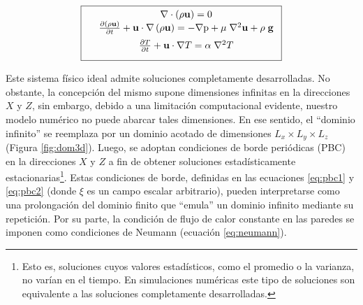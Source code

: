 \begin{equation}
        \boxed{ \begin{array}{lcc}
              &  \nabla \cdot \left( \rho \mathbf{u} \right) = 0 \\
              \vspace*{2mm}
              &  \frac{\partial \left( \rho \mathbf{u} \right)}{\partial t} + \mathbf{u} \cdot \nabla  \left( \rho \mathbf{u} \right) = -\nabla \text{p} + \mu \hspace{1mm} {\nabla}^2 \mathbf{u}  + \rho \hspace{1mm} \mathbf{g} \\
              \vspace*{2mm}
              &  \frac{\partial T}{\partial t} + \mathbf{u} \cdot \nabla T =  \alpha \hspace{1mm} \nabla^2 T  \\
             \end{array}
               }
             \label{eq:gob_system}
\end{equation}


Este sistema físico ideal admite soluciones completamente desarrolladas. No obstante, la concepción del mismo supone dimensiones infinitas en la direcciones $X$ y $Z$, sin embargo, debido a una limitación computacional evidente, nuestro modelo numérico no puede abarcar tales dimensiones. En ese sentido, el ``dominio infinito'' se reemplaza por un dominio acotado de dimensiones $L_x \times L_y \times L_z$ (Figura \ref{fig:dom3d}). Luego, se adoptan condiciones de borde periódicas (PBC) en la direcciones $X$ y $Z$ a fin de obtener soluciones estadísticamente estacionarias\footnote{Esto es, soluciones cuyos valores estadísticos, como el promedio o la varianza, no varían en el tiempo. En simulaciones numéricas este tipo de soluciones son equivalente a las soluciones completamente desarrolladas.}. Estas condiciones de borde, definidas en las ecuaciones \ref{eq:pbc1} y \ref{eq:pbc2} (donde $\xi$ es un campo escalar arbitrario), pueden interpretarse como una prolongación del dominio finito que ``emula'' un dominio infinito mediante su repetición. Por su parte, la condición de flujo de calor constante en las paredes se imponen como condiciones de Neumann (ecuación \ref{eq:neumann}).

